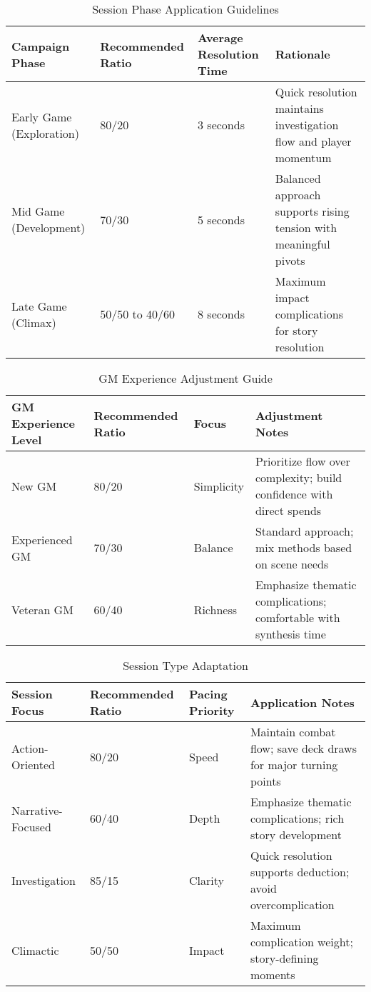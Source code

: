 \begin{table}[htbp]
\centering
\caption{Session Phase Application Guidelines}
\begin{tabular}{|p{2.5cm}|p{2.5cm}|p{2.5cm}|p{5cm}|}
\hline
\textbf{Campaign Phase} & \textbf{Recommended Ratio} & \textbf{Average Resolution Time} & \textbf{Rationale} \\
\hline
Early Game (Exploration) & 80/20 & 3 seconds & Quick resolution maintains investigation flow and player momentum \\
\hline
Mid Game (Development) & 70/30 & 5 seconds & Balanced approach supports rising tension with meaningful pivots \\
\hline
Late Game (Climax) & 50/50 to 40/60 & 8 seconds & Maximum impact complications for story resolution \\
\hline
\end{tabular}
\end{table}

\begin{table}[htbp]
\centering
\caption{GM Experience Adjustment Guide}
\begin{tabular}{|p{3cm}|p{3cm}|p{3cm}|p{4cm}|}
\hline
\textbf{GM Experience Level} & \textbf{Recommended Ratio} & \textbf{Focus} & \textbf{Adjustment Notes} \\
\hline
New GM & 80/20 & Simplicity & Prioritize flow over complexity; build confidence with direct spends \\
\hline
Experienced GM & 70/30 & Balance & Standard approach; mix methods based on scene needs \\
\hline
Veteran GM & 60/40 & Richness & Emphasize thematic complications; comfortable with synthesis time \\
\hline
\end{tabular}
\end{table}

\begin{table}[htbp]
\centering
\caption{Session Type Adaptation}
\begin{tabular}{|p{3cm}|p{3cm}|p{3cm}|p{4cm}|}
\hline
\textbf{Session Focus} & \textbf{Recommended Ratio} & \textbf{Pacing Priority} & \textbf{Application Notes} \\
\hline
Action-Oriented & 80/20 & Speed & Maintain combat flow; save deck draws for major turning points \\
\hline
Narrative-Focused & 60/40 & Depth & Emphasize thematic complications; rich story development \\
\hline
Investigation & 85/15 & Clarity & Quick resolution supports deduction; avoid overcomplication \\
\hline
Climactic & 50/50 & Impact & Maximum complication weight; story-defining moments \\
\hline
\end{tabular}
\end{table}
